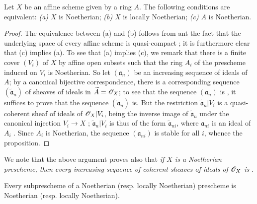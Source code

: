 \begin{proposition}[6.1.3]
\label{I.6.1.3}
Let $X$ be an affine scheme given by a ring $A$.
The following conditions are equivalent:
\emph{(a)} $X$ is Noetherian;
\emph{(b)} $X$ is locally Noetherian;
\emph{(c)} $A$ is Noetherian.
\end{proposition}

\begin{proof}
The equivalence between (a) and (b) follows from  ant the fact that the underlying space of every affine scheme is quasi-compact ; it is furthermore clear that (c) implies (a).
To see that (a) implies (c), we remark that there is a finite cover $(V_i)$ of $X$ by affine open subsets such that the ring $A_i$ of the prescheme induced on $V_i$ is Noetherian.
So let $(\mathfrak{a}_n)$ be an increasing sequence of ideals of $A$; by a canonical bijective correspondence, there is a corresponding sequence $(\widetilde{\mathfrak{a}}_n)$ of sheaves of ideals in $\widetilde{A}=\mathscr{O}_X$;
to see that the sequence $(\mathfrak{a}_n)$ is , it suffices to prove that the sequence $(\widetilde{\mathfrak{a}}_n)$ is.
But the restriction $\widetilde{\mathfrak{a}}_n|V_i$ is a quasi-coherent sheaf of ideals of $\mathscr{O}_X|V_i$, being the inverse image of $\widetilde{\mathfrak{a}}_n$ under the canonical injection $V_i\to X$ ;
$\widetilde{\mathfrak{a}}_n|V_i$ is thus of the form $\widetilde{\mathfrak{a}}_{ni}$, where $\mathfrak{a}_{ni}$ is an ideal of $A_i$ .
Since $A_i$ is Noetherian, the sequence $(\mathfrak{a}_{ni})$ is stable for all $i$, whence the proposition.
\end{proof}

We note that the above argument proves also that \emph{if $X$ is a Noetherian prescheme, then every increasing sequence of coherent sheaves of ideals of $\mathscr{O}_X$ is }.

\begin{proposition}[6.1.4]
\label{I.6.1.4}
Every subprescheme of a Noetherian (resp. locally Noetherian) prescheme is Noetherian (resp. locally Noetherian).
\end{proposition}

